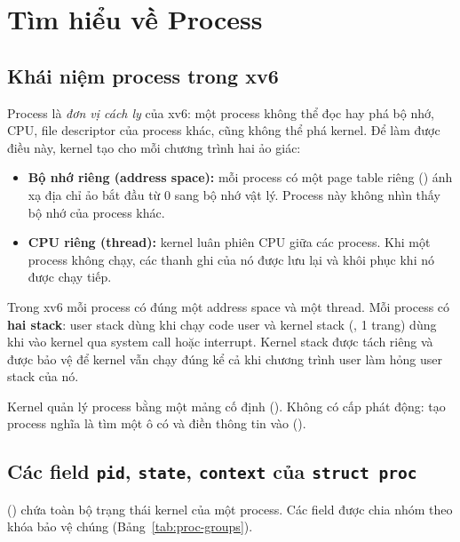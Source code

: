 \section{Tìm hiểu về Process}

\subsection{Khái niệm process trong xv6}

Process là \emph{đơn vị cách ly} của xv6: một process không
thể đọc hay phá bộ nhớ, CPU, file descriptor của process khác, cũng không thể
phá kernel. Để làm được điều này, kernel tạo cho mỗi chương trình hai ảo giác:

\begin{itemize}
  \item \textbf{Bộ nhớ riêng (address space):} mỗi process có một page table
        riêng () ánh xạ địa chỉ ảo bắt đầu từ 0 sang bộ nhớ
        vật lý. Process này không nhìn thấy bộ nhớ của process khác.
  \item \textbf{CPU riêng (thread):} kernel luân phiên CPU giữa các process.
        Khi một process không chạy, các thanh ghi của nó được lưu lại và khôi
        phục khi nó được chạy tiếp.
\end{itemize}

Trong xv6 mỗi process có đúng một address space và một thread. Mỗi process có
\textbf{hai stack}: user stack dùng khi chạy code user và kernel stack
(, 1 trang) dùng khi vào kernel qua system call hoặc
interrupt. Kernel stack được tách riêng và được bảo vệ để kernel vẫn chạy
đúng kể cả khi chương trình user làm hỏng user stack của nó.

Kernel quản lý process bằng một mảng cố định 
(). Không có cấp phát động: tạo process nghĩa là tìm một ô
có  và điền thông tin vào ().

\subsection{Các field \texttt{pid}, \texttt{state}, \texttt{context} của \texttt{struct proc}}
\label{sec:proc-fields}

 () chứa toàn bộ trạng thái kernel của
một process. Các field được chia nhóm theo khóa bảo vệ chúng
(Bảng~\ref{tab:proc-groups}).

